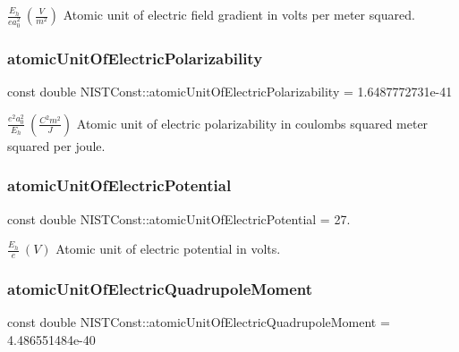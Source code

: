 $\frac{E_h}{e a_0^2}\ (\frac{V}{m^2})$ Atomic unit of electric field gradient in volts per meter squared. \mbox{\label{group___n_i_s_t_const-_atomic_unit_ga5809393ec8d30cbb7e0c7a2f168e48ec}} 
\subsubsection{\texorpdfstring{atomic\+Unit\+Of\+Electric\+Polarizability}{atomicUnitOfElectricPolarizability}}
{\footnotesize\ttfamily const double N\+I\+S\+T\+Const\+::atomic\+Unit\+Of\+Electric\+Polarizability = 1.\+6487772731e-\/41}

$\frac{e^2 a_0^2}{E_h} \ (\frac{C^2 m^2}{J})$ Atomic unit of electric polarizability in coulombs squared meter squared per joule. \mbox{\label{group___n_i_s_t_const-_atomic_unit_ga139c6486b1899658838d403380fc229a}} 
\subsubsection{\texorpdfstring{atomic\+Unit\+Of\+Electric\+Potential}{atomicUnitOfElectricPotential}}
{\footnotesize\ttfamily const double N\+I\+S\+T\+Const\+::atomic\+Unit\+Of\+Electric\+Potential = 27.}

$ \frac{E_h}{e}\ (V)$ Atomic unit of electric potential in volts. \mbox{\label{group___n_i_s_t_const-_atomic_unit_gae7f2ec900567291168cdf7351248074d}} 
\subsubsection{\texorpdfstring{atomic\+Unit\+Of\+Electric\+Quadrupole\+Moment}{atomicUnitOfElectricQuadrupoleMoment}}
{\footnotesize\ttfamily const double N\+I\+S\+T\+Const\+::atomic\+Unit\+Of\+Electric\+Quadrupole\+Moment = 4.\+486551484e-\/40}


